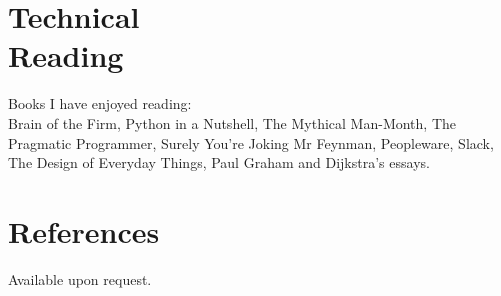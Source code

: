 \documentclass[line,margin]{res}
\begin{document}
\begin{resume}
\section{Technical \\ Reading}
Books I have enjoyed reading: \\
Brain of the Firm,
Python in a Nutshell, %
The Mythical Man-Month, %
The Pragmatic Programmer,
Surely You're Joking Mr Feynman,
Peopleware, %
Slack,
The Design of Everyday Things,
Paul Graham and Dijkstra's essays.

\section{References}
Available upon request.

\end{resume}
\end{document}
